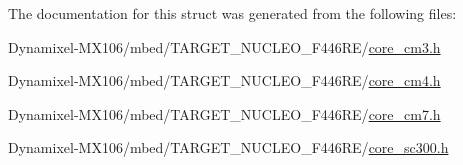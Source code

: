 The documentation for this struct was generated from the following files\+:\begin{DoxyCompactItemize}
\item 
Dynamixel-\/\+M\+X106/mbed/\+T\+A\+R\+G\+E\+T\+\_\+\+N\+U\+C\+L\+E\+O\+\_\+\+F446\+R\+E/\hyperlink{core__cm3_8h}{core\+\_\+cm3.\+h}\item 
Dynamixel-\/\+M\+X106/mbed/\+T\+A\+R\+G\+E\+T\+\_\+\+N\+U\+C\+L\+E\+O\+\_\+\+F446\+R\+E/\hyperlink{core__cm4_8h}{core\+\_\+cm4.\+h}\item 
Dynamixel-\/\+M\+X106/mbed/\+T\+A\+R\+G\+E\+T\+\_\+\+N\+U\+C\+L\+E\+O\+\_\+\+F446\+R\+E/\hyperlink{core__cm7_8h}{core\+\_\+cm7.\+h}\item 
Dynamixel-\/\+M\+X106/mbed/\+T\+A\+R\+G\+E\+T\+\_\+\+N\+U\+C\+L\+E\+O\+\_\+\+F446\+R\+E/\hyperlink{core__sc300_8h}{core\+\_\+sc300.\+h}\end{DoxyCompactItemize}
